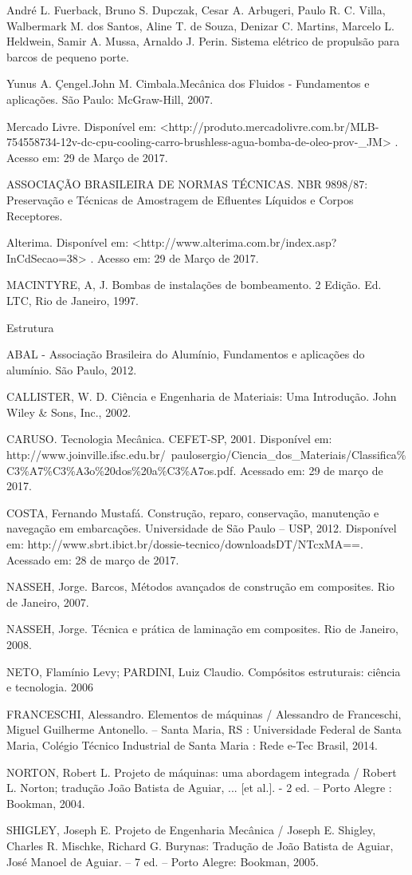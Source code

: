 André L. Fuerback, Bruno S. Dupczak, Cesar A. Arbugeri, Paulo R. C. Villa, Walbermark M. dos Santos, Aline T. de Souza, Denizar C. Martins, Marcelo L. Heldwein, Samir A. Mussa, Arnaldo J. Perin. Sistema elétrico de propulsão para barcos de pequeno porte.

Yunus A. Çengel.John M. Cimbala.Mecânica dos Fluidos - Fundamentos e aplicações. São Paulo: McGraw-Hill, 2007.

Mercado Livre. Disponível em: <http://produto.mercadolivre.com.br/MLB-754558734-12v-dc-cpu-cooling-carro-brushless-agua-bomba-de-oleo-prov-\_JM> . Acesso em: 29 de Março de 2017.

ASSOCIAÇÃO BRASILEIRA DE NORMAS TÉCNICAS. NBR 9898/87: Preservação e Técnicas de Amostragem de Efluentes Líquidos e Corpos Receptores.  

Alterima. Disponível em: <http://www.alterima.com.br/index.asp?InCdSecao=38> . Acesso em: 29 de Março de 2017.

MACINTYRE, A, J. Bombas de instalações de bombeamento. 2 Edição. Ed. LTC, Rio de Janeiro, 1997.


Estrutura

ABAL - Associação Brasileira do Alumínio, Fundamentos e aplicações do alumínio. São Paulo, 2012.
 
CALLISTER, W. D. Ciência e Engenharia de Materiais: Uma Introdução. John Wiley \& Sons, Inc., 2002.
 
CARUSO. Tecnologia Mecânica. CEFET-SP, 2001. Disponível em: http://www.joinville.ifsc.edu.br/~paulosergio/Ciencia\_dos\_Materiais/Classifica\%C3\%A7\%C3\%A3o\%20dos\%20a\%C3\%A7os.pdf. Acessado em: 29 de março de 2017.

COSTA, Fernando Mustafá. Construção, reparo, conservação, manutenção e navegação em embarcações. Universidade de São Paulo – USP, 2012. Disponível em: http://www.sbrt.ibict.br/dossie-tecnico/downloadsDT/NTcxMA==. Acessado em: 28 de março de 2017.

NASSEH, Jorge. Barcos, Métodos avançados de construção em composites. Rio de Janeiro, 2007.

NASSEH, Jorge. Técnica e prática de laminação em composites. Rio de Janeiro, 2008.
 
NETO, Flamínio Levy; PARDINI, Luiz Claudio. Compósitos estruturais: ciência e tecnologia. 2006

FRANCESCHI, Alessandro. Elementos de máquinas / Alessandro de Franceschi, Miguel Guilherme Antonello. – Santa Maria, RS : Universidade Federal de Santa Maria, Colégio Técnico Industrial de Santa Maria : Rede e-Tec Brasil, 2014.

NORTON, Robert L. Projeto de máquinas: uma abordagem integrada / Robert L. Norton; tradução João Batista de Aguiar, ... [et al.]. - 2 ed. – Porto Alegre : Bookman, 2004.

SHIGLEY, Joseph E. Projeto de Engenharia Mecânica / Joseph E. Shigley, Charles R. Mischke, Richard G. Burynas: Tradução de João Batista de Aguiar, José Manoel de Aguiar. – 7 ed. – Porto Alegre: Bookman, 2005.